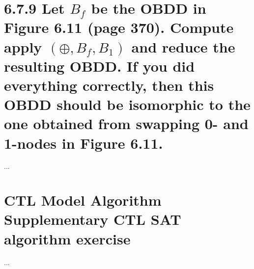 \documentclass[11pt,a4paper]{article}
\begin{document}
\section*{6.7.9 \mdseries Let $B_f$ be the OBDD in Figure 6.11 (page 370).
Compute apply $(\oplus,B_f,B_1)$ and reduce the resulting OBDD. If you did
everything correctly, then this OBDD should be isomorphic to the one obtained
from swapping 0- and 1-nodes in Figure 6.11.}
...

\newpage
\section*{CTL Model Algorithm \mdseries Supplementary CTL SAT algorithm
exercise}
...
\end{document}
